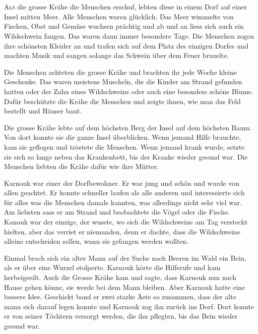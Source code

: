\chapter*{\FontH{\Huge }}
\lettrine[lines=2]{\color{red}A}{ls} die grosse Krähe die Menschen erschuf, lebten diese in einem Dorf auf einer Insel mitten Meer. Alle Menschen waren glücklich. Das Meer wimmelte von Fischen, Obst und Gemüse wuchsen prächtig und ab und an liess sich auch ein Wildschwein fangen. Das waren dann immer besondere Tage. Die Menschen zogen ihre schönsten Kleider an und trafen sich auf dem Platz des einzigen Dorfes und machten Musik und sangen solange das Schwein über dem Feuer bruzelte.

Die Menschen achteten die grosse Krähe und brachten ihr jede Woche kleine Geschenke. Das waren meistens Muscheln, die die Kinder am Strand gefunden hatten oder der Zahn eines Wildschweins oder auch eine besonders schöne Blume. Dafür beschützte die Krähe die Menschen und zeigte ihnen, wie man das Feld bestellt und Häuser baut.

Die grosse Krähe lebte auf dem höchsten Berg der Insel auf dem höchsten Baum. Von dort konnte sie die ganze Insel überblicken. Wenn jemand Hilfe brauchte, kam sie geflogen und tröstete die Menschen. Wenn jemand krank wurde, setzte sie sich so lange neben das Krankenbett, bis der Kranke wieder gesund war. Die Menschen liebten die Krähe dafür wie ihre Mütter.

Karnouk war einer der Dorfbewohner. Er war jung und schön und wurde von allen geachtet. Er konnte schneller laufen als alle anderen und interessierte sich für alles was die Menschen damals kannten, was allerdings nicht sehr viel war. Am liebsten sass er am Strand und beobachtete die Vögel oder die Fische. Kanouk war der einzige, der wusste, wo sich die Wildschweine am Tag versteckt hielten, aber das verriet er niemanden, denn er dachte, dass die Wildschweine alleine entscheiden sollen, wann sie gefangen werden wollten.

Einmal brach sich ein alter Mann auf der Suche nach Beeren im Wald ein Bein, als er über eine Wurzel stolperte. Karnouk hörte die Hilferufe und kam herbeigeeilt. Auch die Grosse Krähe kam und sagte, dass Karnouk nun nach Hause gehen könne, sie werde bei dem Mann bleiben. Aber Karnouk hatte eine bessere Idee. Geschickt band er zwei starke Äste so zusammen, dass der alte mann sich darauf legen konnte und Karnouk zog ihn zurück ins Dorf. Dort konnte er von seiner Töchtern versorgt werden, die ihn pflegten, bis das Bein wieder gesund war.

